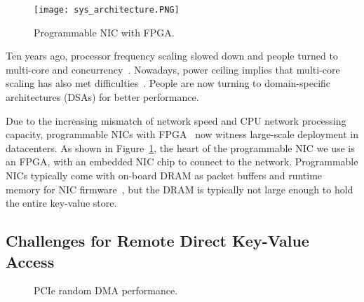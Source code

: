 \begin{figure}[t]
\centering
\texttt{[image: sys\_architecture.PNG]}
\caption{Programmable NIC with FPGA.}
\label{kvdirect:fig:kvdirect-arch}

\end{figure}

Ten years ago, processor frequency scaling slowed down and people turned to multi-core and concurrency~\cite{sutter2005free}.
Nowadays, power ceiling implies that multi-core scaling has also met difficulties~\cite{esmaeilzadeh2013power}.
People are now turning to domain-specific architectures (DSAs) for better performance.


Due to the increasing mismatch of network speed and CPU network processing capacity, programmable NICs with FPGA~\cite{vfp,greenberg2015sdn,li2016clicknp,caulfield2016cloud} now witness large-scale deployment in datacenters.
As shown in Figure~\ref{kvdirect:fig:kvdirect-arch}, the heart of the programmable NIC we use is an FPGA, with an embedded NIC chip to connect to the network.
Programmable NICs typically come with on-board DRAM as packet buffers and runtime memory for NIC firmware~\cite{li2016clicknp}, but the DRAM is typically not large enough to hold the entire key-value store.

\subsection{Challenges for Remote Direct Key-Value Access}
\label{kvdirect:sec:challenge}

\begin{figure}[t]
\centering
{}
\caption{PCIe random DMA performance.}
\label{kvdirect:fig:dma-perf}

\end{figure}

